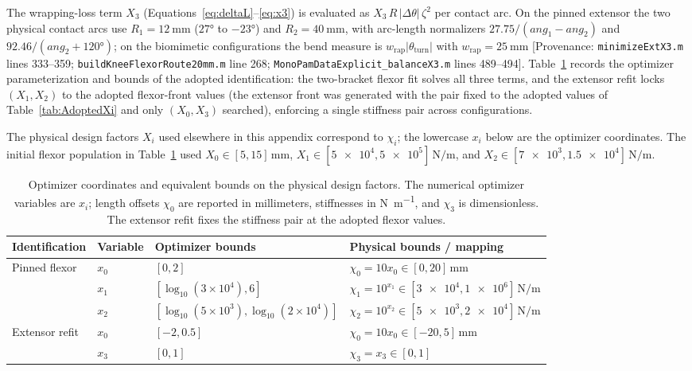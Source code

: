 The wrapping-loss term $X_{3}$ (Equations~\ref{eq:deltaL}--\ref{eq:x3}) is evaluated as $X_{3}\,R\,\lvert\Delta\theta\rvert\,\zeta^{2}$ per contact arc. On the pinned extensor the two physical contact arcs use $R_{1} = \qty{12}{\mm}$ ($\ang{27}$ to $\ang{-23}$) and $R_{2} = \qty{40}{\mm}$, with arc-length normalizers $27.75/(ang_{1} - ang_{2})$ and $92.46/(ang_{2}+\ang{120})$; on the biomimetic configurations the bend measure is $w_{\text{rap}}\lvert\theta_{\text{turn}}\rvert$ with $w_{\text{rap}} = \qty{25}{\mm}$ [Provenance: \nolinkurl{minimizeExtX3.m} lines 333--359; \nolinkurl{buildKneeFlexorRoute20mm.m} line 268; \nolinkurl{MonoPamDataExplicit_balanceX3.m} lines 489--494]. Table~\ref{tab:app_opt_bounds} records the optimizer parameterization and bounds of the adopted identification: the two-bracket flexor fit solves all three terms, and the extensor refit locks $(X_{1}, X_{2})$ to the adopted flexor-front values (the extensor front was generated with the pair fixed to the adopted values of Table~\ref{tab:AdoptedXi} and only $(X_{0}, X_{3})$ searched), enforcing a single stiffness pair across configurations.

The physical design factors $X_i$ used elsewhere in this appendix correspond to $\chi_i$; the lowercase $x_i$ below are the optimizer coordinates. The initial flexor population in Table~\ref{tab:app_opt_bounds} used $X_0\in[\num{5},\num{15}]\,\unit{\mm}$, $X_1\in[\num{5e4},\num{5e5}]\,\unit{\newton\per\meter}$, and $X_2\in[\num{7e3},\num{1.5e4}]\,\unit{\newton\per\meter}$.

\begin{table}[htbp]
\caption{Optimizer coordinates and equivalent bounds on the physical design factors. The numerical optimizer variables are $x_i$; length offsets $\chi_0$ are reported in millimeters, stiffnesses in \unit{\newton\per\meter}, and $\chi_3$ is dimensionless. The extensor refit fixes the stiffness pair at the adopted flexor values.}
\label{tab:app_opt_bounds}
\small
\begin{tabularx}{\textwidth}{@{}l l >{\raggedright\arraybackslash}X >{\raggedright\arraybackslash}X@{}}
\toprule
Identification & Variable & Optimizer bounds & Physical bounds / mapping \\
\midrule
Pinned flexor & $x_0$ & $[0,2]$ & $\chi_0=10x_0\in[\num{0},\num{20}]\,\unit{\mm}$ \\
 & $x_1$ & $[\log_{10}(3\times10^4),6]$ & $\chi_1=10^{x_1}\in[\num{3e4},\num{1e6}]\,\unit{\newton\per\meter}$ \\
 & $x_2$ & $[\log_{10}(5\times10^3),\log_{10}(2\times10^4)]$ & $\chi_2=10^{x_2}\in[\num{5e3},\num{2e4}]\,\unit{\newton\per\meter}$ \\
Extensor refit & $x_0$ & $[-2,0.5]$ & $\chi_0=10x_0\in[\num{-20},\num{5}]\,\unit{\mm}$ \\
 & $x_3$ & $[0,1]$ & $\chi_3=x_3\in[0,1]$ \\
\bottomrule
\end{tabularx}
\end{table}

